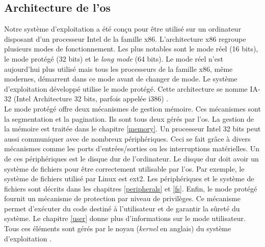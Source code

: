 
\subsection{Architecture de l'\acrshort{os}}
Notre système d'exploitation a été conçu pour être utilisé sur un ordinateur
disposant d'un processeur Intel de la famille x86. L'architecture x86 regroupe
plusieurs modes de fonctionnement. Les plus notables sont le mode réel
(16 bits), le mode protégé (32 bits) et le \textit{long mode} (64 bits).
Le mode réel n'est aujourd'hui plus utilisé mais tous les processeurs de la
famille x86, même modernes, démarrent dans ce mode avant de changer de mode.
Le système d'exploitation développé utilise le mode protégé. Cette architecture
se nomme \acrshort{IA-32} (Intel Architecture 32 bits, parfois appelée i386)
\cite{ref42}. \\

Le mode protégé offre deux mécanismes de gestion mémoire.
Ces mécanismes sont la segmentation et la pagination. Ils sont tous deux gérés
par l'\acrshort{os}. La gestion de la mémoire est traitée dans le chapitre \ref{memory}.
Un processeur Intel 32 bits peut aussi communiquer avec de nombreux périphériques.
Ceci se fait grâce à divers mécanismes comme les ports d'entrées/sorties ou
les interruptions matérielles. Un de ces périphériques est le disque dur de
l'ordinateur. Le disque dur doit avoir un système de fichiers pour être correctement
utilisable par l'\acrshort{os}. Par exemple, le système de fichiers utilisé
par Linux est ext2. Les périphériques et le système de fichiers sont décrits
dans les chapitres \ref{peripherals} et \ref{fs}. Enfin, le mode protégé fournit
un mécanisme de protection par niveau de privilèges. Ce mécanisme permet d'exécuter
du code destiné à l'utilisateur et de garantir la sûreté du système. Le chapitre
\ref{user} donne plus d'informations sur le mode utilisateur. Tous ces éléments
sont gérés par le noyau (\textit{kernel} en anglais) du système d'exploitation \cite{ref42}.

